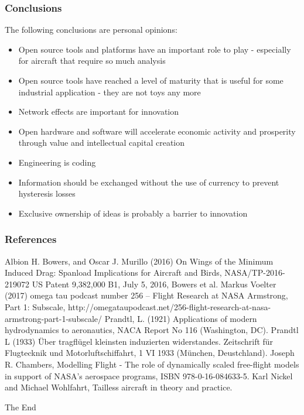 \documentclass{beamer}
\begin{document}
\begin{frame}
\frametitle{Conclusions}

The following conclusions are personal opinions:

\begin{itemize}
\item Open source tools and platforms have an important role to play - especially for aircraft that require so much analysis
\item Open source tools have reached a level of maturity that is useful for some industrial application - they are not toys any more
\item Network effects are important for innovation
\item Open hardware and software will accelerate economic activity and prosperity through value and intellectual capital creation
\item Engineering is coding
\item Information should be exchanged without the use of currency to prevent hysteresis losses
\item Exclusive ownership of ideas is probably a barrier to innovation
\end{itemize}
\end{frame}


\begin{frame}
\frametitle{References}
\footnotesize{
\begin{thebibliography}{99} %

 Albion H. Bowers, and Oscar J. Murillo (2016) On Wings of the Minimum Induced Drag:  Spanload Implications for Aircraft and Birds, NASA/TP-2016-219072
 US Patent 9,382,000 B1, July 5, 2016, Bowers et al.
 Markus Voelter (2017) omega tau podcast number 256 – Flight Research at NASA Armstrong, Part 1: Subscale, http://omegataupodcast.net/256-flight-research-at-nasa-armstrong-part-1-subscale/
 Prandtl, L.  (1921)  Applications  of  modern hydrodynamics  to  aeronautics,  NACA  Report  No  116 (Washington, DC).
 Prandtl L (1933) Über tragfl\"ugel kleinsten induzierten widerstandes. Zeitschrift für Flugtecknik und Motorluftschiffahrt, 1 VI 1933 (M\"unchen, Deustchland).
 Joseph R. Chambers, Modelling Flight - The role of dynamically scaled free-flight models in support of NASA's aerospace programs, ISBN 978-0-16-084633-5.
 Karl Nickel and Michael Wohlfahrt, Tailless aircraft in theory and practice.


\end{thebibliography}
}
\end{frame}



\begin{frame}
\Huge{\centerline{The End}}
\end{frame}

\end{document}
